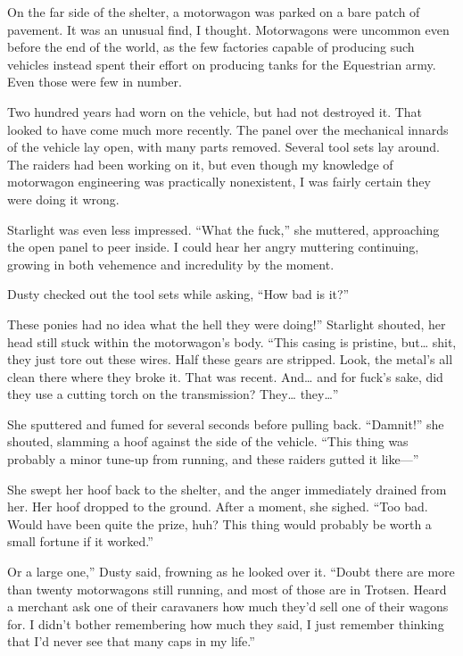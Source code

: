 On the far side of the shelter, a motorwagon was parked on a bare patch of pavement. It was an unusual find, I thought. Motorwagons were uncommon even before the end of the world, as the few factories capable of producing such vehicles instead spent their effort on producing tanks for the Equestrian army. Even those were few in number.

Two hundred years had worn on the vehicle, but had not destroyed it. That looked to have come much more recently. The panel over the mechanical innards of the vehicle lay open, with many parts removed. Several tool sets lay around. The raiders had been working on it, but even though my knowledge of motorwagon engineering was practically nonexistent, I was fairly certain they were doing it wrong.

Starlight was even less impressed. “What the fuck,” she muttered, approaching the open panel to peer inside. I could hear her angry muttering continuing, growing in both vehemence and incredulity by the moment.

Dusty checked out the tool sets while asking, “How bad is it?”

\leavevmode{}These ponies had no idea what the hell they were doing!” Starlight shouted, her head still stuck within the motorwagon’s body. “This casing is pristine, but… shit, they just tore out these wires. Half these gears are stripped. Look, the metal’s all clean there where they broke it. That was recent. And… and for fuck’s sake, did they use a cutting torch on the transmission? They… they…”

She sputtered and fumed for several seconds before pulling back. “Damnit!” she shouted, slamming a hoof against the side of the vehicle. “This thing was probably a minor tune-up from running, and these raiders gutted it like—”

She swept her hoof back to the shelter, and the anger immediately drained from her. Her hoof dropped to the ground. After a moment, she sighed. “Too bad. Would have been quite the prize, huh? This thing would probably be worth a small fortune if it worked.”

\leavevmode{}Or a large one,” Dusty said, frowning as he looked over it. “Doubt there are more than twenty motorwagons still running, and most of those are in Trotsen. Heard a merchant ask one of their caravaners how much they’d sell one of their wagons for. I didn’t bother remembering how much they said, I just remember thinking that I’d never see that many caps in my life.”

